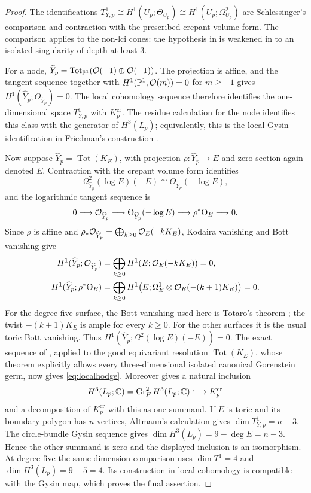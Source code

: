 \begin{proof}
The identifications
$T^1_{Y,p}\cong H^1(U_p;\Theta_{U_p})\cong H^1(U_p;\Omega^2_{U_p})$
are Schlessinger's comparison \cite{Schlessinger71} and contraction with the prescribed crepant volume
form.  The comparison applies to the non-lci cones: the hypothesis in
\cite[Lem.~1.17 and Lem.~4.1]{FL22a} is weakened in
\cite[Rem.~4.2]{FL22a} to an isolated singularity of depth at least $3$.

For a node,
$\widehat Y_p=\operatorname{Tot}_{\mathbb{P}^1}(\mathcal{O}(-1)\oplus\mathcal{O}(-1))$.
The projection is affine, and the tangent sequence together with
$H^1(\mathbb{P}^1,\mathcal{O}(m))=0$ for $m\ge-1$ gives
$H^1(\widehat Y_p;\Theta_{\widehat Y_p})=0$.  The local cohomology sequence
therefore identifies the one-dimensional space $T^1_{Y,p}$ with
$K_p^{\mathrm{cr}}$.  The residue calculation for the node identifies this
class with the generator of $H^3(L_p)$; equivalently, this is the local
Gysin identification in Friedman's construction \cite{Friedman86}.

Now suppose $\widehat Y_p=\operatorname{Tot}(K_E)$, with projection
$\rho\colon\widehat Y_p\to E$ and zero section again denoted $E$.  Contraction
with the crepant volume form identifies
\[
 \Omega^2_{\widehat Y_p}(\log E)(-E)
 \cong \Theta_{\widehat Y_p}(-\log E),
\]
and the logarithmic tangent sequence is
\[
 0\longrightarrow\mathcal{O}_{\widehat Y_p}\longrightarrow
 \Theta_{\widehat Y_p}(-\log E)\longrightarrow\rho^*\Theta_E
 \longrightarrow0.
\]
Since $\rho$ is affine and
$\rho_*\mathcal{O}_{\widehat Y_p}=\bigoplus_{k\ge0}\mathcal{O}_E(-kK_E)$, Kodaira vanishing
and Bott vanishing give
\begin{align*}
 H^1(\widehat Y_p;\mathcal{O}_{\widehat Y_p})
   &=\bigoplus_{k\ge0}H^1(E;\mathcal{O}_E(-kK_E))=0,\\
 H^1(\widehat Y_p;\rho^*\Theta_E)
   &=\bigoplus_{k\ge0}H^1
      \bigl(E;\Omega^1_E\otimes\mathcal{O}_E(-(k+1)K_E)\bigr)=0.
\end{align*}
For the degree-five surface, the Bott vanishing used here is
Totaro's theorem \cite[Theorem~2.1]{totaro2020}; the twist
$-(k+1)K_E$ is ample for every $k\ge0$.  For the other surfaces
it is the usual toric Bott vanishing.
Thus
$H^1(\widehat Y_p;\Omega^2(\log E)(-E))=0$.  The exact sequence of
\cite[Thm.~2.1(v)]{FL22a}, applied to the good equivariant resolution
$\operatorname{Tot}(K_E)$, whose theorem explicitly allows every
three-dimensional isolated canonical Gorenstein germ, now gives
\eqref{eq:localhodge}.  Moreover \cite[Thm.~2.1(vi)]{FL22a} gives a natural
inclusion
\[
 H^3(L_p;\CC)=\operatorname{Gr}^2_FH^3(L_p;\CC)
 \lhook\joinrel\longrightarrow K_p^{\mathrm{cr}}
\]
and a decomposition of $K_p^{\mathrm{cr}}$ with this as one summand.
If $E$ is toric and its boundary polygon has $n$ vertices, Altmann's calculation gives
$\dim T^1_{Y,p}=n-3$.  The circle-bundle Gysin sequence gives
$\dim H^3(L_p)=9-\deg E=n-3$.  Hence the other summand is zero and the displayed
inclusion is an isomorphism.  At degree five the same dimension
comparison uses $\dim T^1=4$ \cite[\S5.5]{Gross97rev} and
$\dim H^3(L_p)=9-5=4$.  Its construction in local cohomology is
compatible with the Gysin map, which proves the final assertion.
\end{proof}

